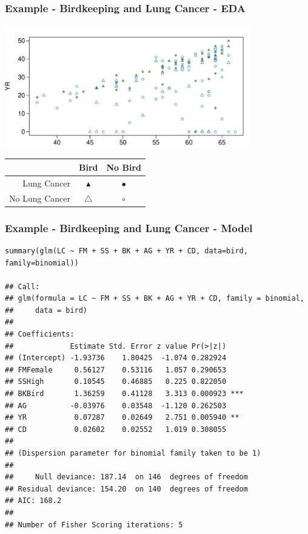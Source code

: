 \begin{frame}
\frametitle{Example - Birdkeeping and Lung Cancer - EDA}

\begin{center}
\includegraphics[width=0.8\textwidth]{8-4_logistic_reg/figures/birds/birds.pdf}
\end{center}

{\scriptsize
\begin{center}
\begin{tabular}{r|cc}
               & Bird             & No Bird \\
\hline               
Lung Cancer    & \textcolor{oiG}{$\blacktriangle$} & \textcolor{oiG}{$\bullet$} \\
No Lung Cancer & \textcolor{oiB}{$\triangle$}      & \textcolor{oiB}{$\circ$}
\end{tabular}
\end{center}
}

 
 
\end{frame}


\begin{frame}[fragile]
\frametitle{Example - Birdkeeping and Lung Cancer - Model}

\vspace{-5mm}

{\scriptsize
\begin{verbatim}
summary(glm(LC ~ FM + SS + BK + AG + YR + CD, data=bird, family=binomial))

## Call:
## glm(formula = LC ~ FM + SS + BK + AG + YR + CD, family = binomial, 
##     data = bird)
## 
## Coefficients:
##             Estimate Std. Error z value Pr(>|z|)    
## (Intercept) -1.93736    1.80425  -1.074 0.282924    
## FMFemale     0.56127    0.53116   1.057 0.290653    
## SSHigh       0.10545    0.46885   0.225 0.822050    
## BKBird       1.36259    0.41128   3.313 0.000923 ***
## AG          -0.03976    0.03548  -1.120 0.262503    
## YR           0.07287    0.02649   2.751 0.005940 ** 
## CD           0.02602    0.02552   1.019 0.308055    
## 
## (Dispersion parameter for binomial family taken to be 1)
## 
##     Null deviance: 187.14  on 146  degrees of freedom
## Residual deviance: 154.20  on 140  degrees of freedom
## AIC: 168.2
## 
## Number of Fisher Scoring iterations: 5
\end{verbatim}
}

\end{frame}

